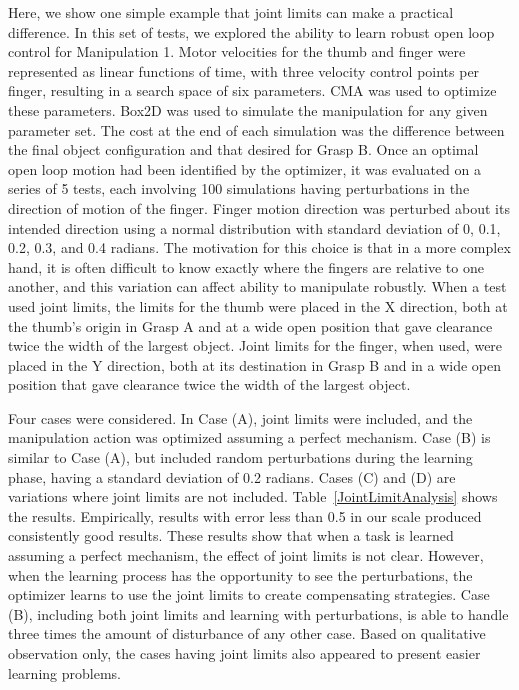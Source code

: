 Here, we show one simple example that joint limits can make a practical difference.   In this set of tests, we explored the ability to learn robust open loop control for Manipulation 1.    Motor velocities for the thumb and finger were represented as linear functions of time, with three velocity control points per finger, resulting in a search space of six parameters.   CMA was used to optimize these parameters.    Box2D was used to simulate the manipulation for any given parameter set.   The cost at the end of each simulation was the difference between the final object configuration and that desired for Grasp B.     Once an optimal open loop motion had been identified by the optimizer, it was evaluated on a series of 5 tests, each involving 100 simulations having perturbations in the direction of motion of the finger.    Finger motion direction was perturbed about its intended direction using a normal distribution with standard deviation of 0, 0.1, 0.2, 0.3, and 0.4 radians.    The motivation for this choice is that in a more complex hand, it is often difficult to know exactly where the fingers are relative to one another, and this variation can affect ability to manipulate robustly.   When a test used joint limits, the limits for the thumb were placed in the X direction, both at the thumb's origin in Grasp A and at a wide open position that gave clearance twice the width of the largest object.   Joint limits for the finger, when used, were placed in the Y direction, both at its destination in Grasp B and in a wide open position that gave clearance twice the width of the largest object.

Four cases were considered.   In Case (A), joint limits were included, and the manipulation action was optimized assuming a perfect mechanism.   Case (B) is similar to Case (A), but included random perturbations during the learning phase, having a standard deviation of 0.2 radians.    Cases (C) and (D) are variations where joint limits are not included.   Table~\ref{JointLimitAnalysis} shows the results.   Empirically, results with error less than 0.5 in our scale produced consistently good results.   These results show that when a task is learned assuming a perfect mechanism, the effect of joint limits is not clear.    However, when the learning process has the opportunity to see the perturbations, the optimizer learns to use the joint limits to create compensating strategies.    Case (B), including both joint limits and learning with perturbations, is able to handle three times the amount of disturbance of any other case.      Based on qualitative observation only, the cases having joint limits also appeared to present easier learning problems.


